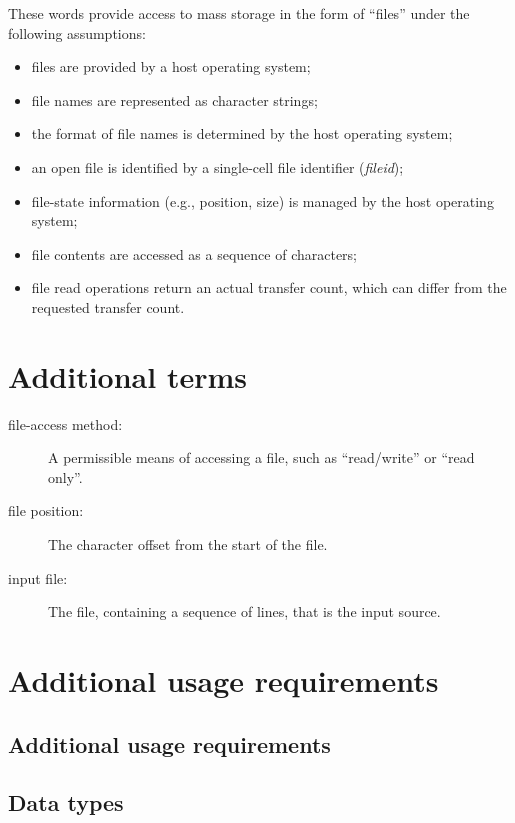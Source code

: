 These words provide access to mass storage in the form of ``files''
under the following assumptions:

\begin{itemize}
\item files are provided by a host operating system;
\item file names are represented as character strings;
\item the format of file names is determined by the host operating
	system;
\item an open file is identified by a single-cell file identifier
	(\emph{fileid});
\item file-state information (e.g., position, size) is managed by
	the host operating system;
\item file contents are accessed as a sequence of characters;
\item file read operations return an actual transfer count, which
	can differ from the requested transfer count.
\end{itemize}

\section{Additional terms} %

\begin{description}
\item[file-access method:]
	A permissible means of accessing a file, such as ``read/write''
	or ``read only''.

\item[file position:]
	The character offset from the start of the file.

\item[input file:]
	The file, containing a sequence of lines, that is the input source.
\end{description}

\section{Additional usage requirements} %

\begin{intro}
\subsection{Additional usage requirements} %
\end{intro}

\subsection{Data types} %

